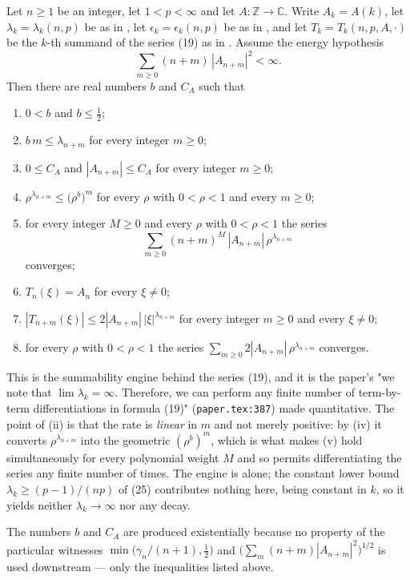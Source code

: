 \begin{helper}
Let $n\ge1$ be an integer, let $1<p<\infty$ and let
$A\colon\mathbb{Z}\to\mathbb{C}$.  Write $A_k=A(k)$, let
$\lambda_k=\lambda_k(n,p)$ be as in , let
$\epsilon_k=\epsilon_k(n,p)$ be as in , and let
$T_k=T_k(n,p,A,\cdot)$ be the $k$-th summand of the series (19) as in
.  Assume the energy hypothesis
\[
  \sum_{m\ge0}(n+m)\,|A_{n+m}|^{2}<\infty .
\]
Then there are real numbers $b$ and $C_A$ such that
\begin{enumerate}
\item[(i)] $0<b$ and $b\le\tfrac12$;
\item[(ii)] $b\,m\le\lambda_{n+m}$ for every integer $m\ge0$;
\item[(iii)] $0\le C_A$ and $|A_{n+m}|\le C_A$ for every integer $m\ge0$;
\item[(iv)] $\rho^{\lambda_{n+m}}\le\bigl(\rho^{b}\bigr)^{m}$ for every
  $\rho$ with $0<\rho<1$ and every $m\ge0$;
\item[(v)] for every integer $M\ge0$ and every $\rho$ with $0<\rho<1$ the
  series
  \[
    \sum_{m\ge0}(n+m)^{M}\,|A_{n+m}|\,\rho^{\lambda_{n+m}}
  \]
  converges;
\item[(vi)] $T_n(\xi)=A_n$ for every $\xi\ne0$;
\item[(vii)] $|T_{n+m}(\xi)|\le2|A_{n+m}|\,|\xi|^{\lambda_{n+m}}$ for every
  integer $m\ge0$ and every $\xi\ne0$;
\item[(viii)] for every $\rho$ with $0<\rho<1$ the series
  $\sum_{m\ge0}2|A_{n+m}|\,\rho^{\lambda_{n+m}}$ converges.
\end{enumerate}

This is the summability engine behind the series (19), and it is the paper's
"we note that $\lim\lambda_k=\infty$.  Therefore, we can perform any finite
number of term-by-term differentiations in formula (19)"
(\texttt{paper.tex:387}) made quantitative.  The point of (ii) is that the rate
is \emph{linear} in $m$ and not merely positive: by (iv) it converts
$\rho^{\lambda_{n+m}}$ into the geometric $(\rho^{b})^{m}$, which is what makes
(v) hold simultaneously for every polynomial weight $M$ and so permits
differentiating the series any finite number of times.  The engine is
 alone; the constant lower bound
$\lambda_k\ge(p-1)/(np)$ of (25) contributes nothing here, being constant in
$k$, so it yields neither $\lambda_k\to\infty$ nor any decay.

The numbers $b$ and $C_A$ are produced existentially because no property of
the particular witnesses $\min\bigl(\gamma_n/(n+1),\tfrac12\bigr)$ and
$\bigl(\sum_m(n+m)|A_{n+m}|^{2}\bigr)^{1/2}$ is used downstream --- only the
inequalities listed above.
\end{helper}
